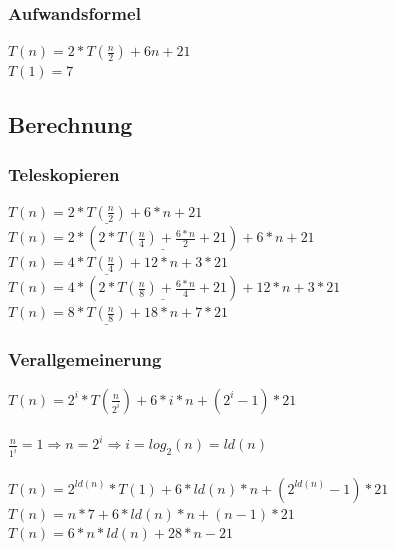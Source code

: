 \documentclass[a4paper,10pt]{article}
\newcommand{\Ra}{\Rightarrow}
\begin{document}
\subsubsection{Aufwandsformel}
$T(n) = 2* T(\frac{n}{2	}) + 6n + 21$ \\
$T(1) = 7$

\subsection{Berechnung}
\subsubsection{Teleskopieren}
$T(n) = 2 * \underline{T(\frac{n}{2})} + 6*n +21$ \\
$T(n) = 2 * (\underline{2*T(\frac{n}{4}) + \frac{6*n}{2} +21 } ) + 6*n + 21$ \\
$T(n) = 4 * \underline{T(\frac{n}{4})} + 12 * n + 3* 21$ \\
$T(n) = 4 * (\underline{2*T(\frac{n}{8}) + \frac{6*n}{4} +21 } ) + 12*n + 3*21$ \\
$T(n) = 8 * \underline{T(\frac{n}{8})} + 18 * n + 7* 21$ 
\subsubsection{Verallgemeinerung}
$T(n) = 2^i*T(\frac{n}{2^i}) +6*i*n +(2^i-1)*21$ \\  \\
$\frac{n}{1^i} = 1 \Ra n=2^i \Ra i = log_2(n) =  ld(n)$ \\ \\
$T(n) = 2^{ld(n)} * T(1) +6*ld(n)*n + (2^{ld(n)} -1) * 21$ \\
$T(n) = n*7 + 6*ld(n)*n +(n-1)*21$ \\
$T(n) = 6*n*ld(n)+28*n-21$
\end{document}
